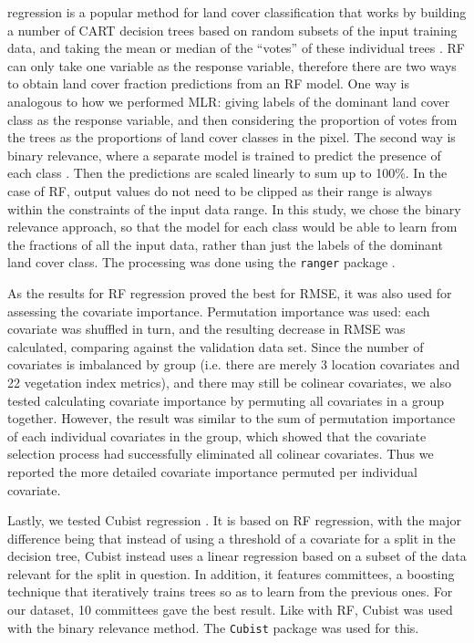 \documentclass[review,authoryear,3p]{elsarticle}
\begin{document}
 regression is a popular method for land cover classification that works by building a number of \gls{CART} decision trees based on random subsets of the input training data, and taking the mean or median of the ``votes'' of these individual trees \citep{breiman2001random}.
\ac{RF} can only take one variable as the response variable, therefore there are two ways to obtain land cover fraction predictions from an \ac{RF} model.
One way is analogous to how we performed \ac{MLR}: giving labels of the dominant land cover class as the response variable, and then considering the proportion of votes from the trees as the proportions of land cover classes in the pixel.
The second way is binary relevance, where a separate model is trained to predict the presence of each class \citet{karalas2016br}.
Then the predictions are scaled linearly to sum up to 100\%.
In the case of \gls{RF}, output values do not need to be clipped as their range is always within the constraints of the input data range.
In this study, we chose the binary relevance approach, so that the model for each class would be able to learn from the fractions of all the input data, rather than just the labels of the dominant land cover class.
The processing was done using the \texttt{ranger} package \citep{ranger}.

As the results for \gls{RF} regression proved the best for \gls{RMSE}, it was also used for assessing the covariate importance.
Permutation importance was used: each covariate was shuffled in turn, and the resulting decrease in \gls{RMSE} was calculated, comparing against the validation data set.
Since the number of covariates is imbalanced by group (i.e. there are merely 3 location covariates and 22 vegetation index metrics), and there may still be colinear covariates, we also tested calculating covariate importance by permuting all covariates in a group together.
However, the result was similar to the sum of permutation importance of each individual covariates in the group, which showed that the covariate selection process had successfully eliminated all colinear covariates.
Thus we reported the more detailed covariate importance permuted per individual covariate.


Lastly, we tested Cubist regression \citep{cubist}.
It is based on \gls{RF} regression, with the major difference being that instead of using a threshold of a covariate for a split in the decision tree, Cubist instead uses a linear regression based on a subset of the data relevant for the split in question.
In addition, it features committees, a boosting technique that iteratively trains trees so as to learn from the previous ones.
For our dataset, 10 committees gave the best result.
Like with \gls{RF}, Cubist was used with the binary relevance method.
The \texttt{Cubist} package \citep{cubistpackage} was used for this.
\end{document}
